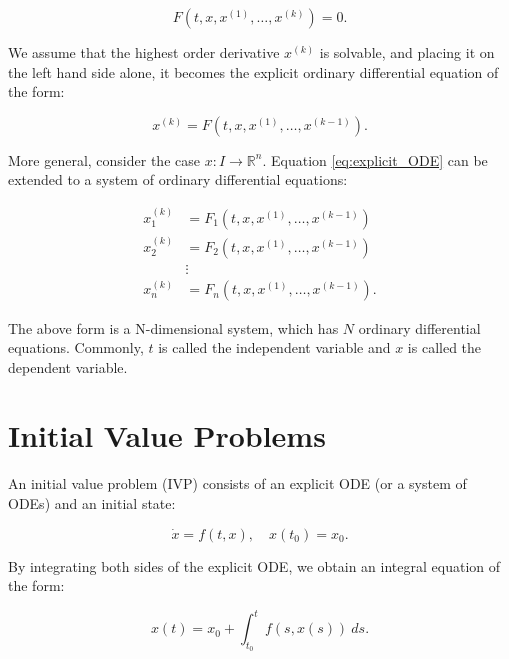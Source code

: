 \documentclass[
	parskip, 			   %
	twoside, 			   %
	DIV=14, 			   %
	BCOR=15.0mm, 		   %
	headsepline, 		   %
	open=right, 		   %
	captions=tableheading, %
	bibliography=totoc,    %
	numbers=noenddot       %
]{scrreprt}
\begin{document}
\begin{equation}
    \label{eq:implicit_ODE}
    F\left(t, x, x^{(1)}, \ldots, x^{(k)}\right)=0.
\end{equation}

We assume that the highest order derivative $x^{(k)}$ is solvable, and placing it on the left hand side alone, it becomes the explicit ordinary differential equation of the form:

\begin{equation}
    \label{eq:explicit_ODE}
    x^{(k)} = F\left(t, x, x^{(1)}, \ldots, x^{(k-1)}\right).
\end{equation}

More general, consider the case $x: I \rightarrow \mathbb{R}^{n}$. Equation \ref{eq:explicit_ODE} can be extended to a system of ordinary differential equations:

\begin{equation}
    \label{eq:ODE_system}
    \begin{aligned}
    x_{1}^{(k)} &=F_{1}\left(t, x, x^{(1)}, \ldots, x^{(k-1)}\right) \\
    x_{2}^{(k)} &=F_{2}\left(t, x, x^{(1)}, \ldots, x^{(k-1)}\right) \\
    & \vdots \\
    x_{n}^{(k)} &=F_{n}\left(t, x, x^{(1)}, \ldots, x^{(k-1)}\right).
\end{aligned}
\end{equation}

The above form is a N-dimensional system, which has $N$ ordinary differential equations. Commonly, $t$ is called the independent variable and $x$ is called the dependent variable.

\section{Initial Value Problems}
An initial value problem (IVP) consists of an explicit ODE (or a system of ODEs) and an initial state:

\begin{equation}
    \label{eq:IVP}
    \dot{x} = f(t, x), \quad x(t_{0})=x_{0}.
\end{equation}

By integrating both sides of the explicit ODE, we obtain an integral equation of the form:

\begin{equation}
    \label{eq:solution_IVP}
    x(t) = x_{0} + \int_{t_{0}}^{t} f(s, x(s))\:ds.
\end{equation}
\end{document}
